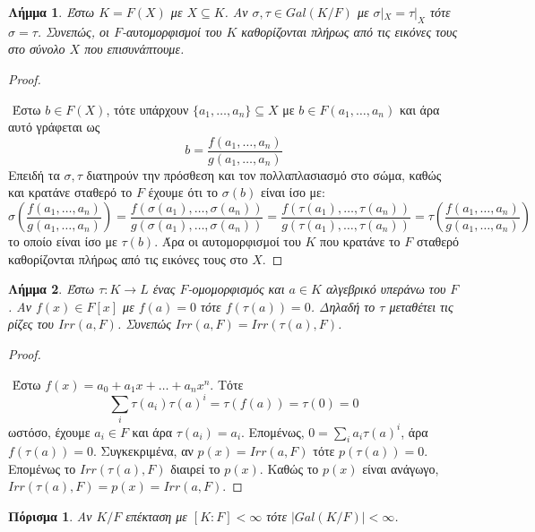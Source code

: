 \documentclass[oneside,a4paper]{article}
\newtheorem{lemma}{Λήμμα}
\newtheorem{cor}{Πόρισμα}
\begin{document}
\begin{lemma}
	Έστω $K=F(X)$ με $X \subseteq K$. Αν $\sigma , \tau \in Gal(K/F)$ με $\sigma|_X = \tau|_X $ τότε $\sigma = \tau$. Συνεπώς, οι $F$-αυτομορφισμοί του $K$ καθορίζονται πλήρως από τις εικόνες τους στο σύνολο $X$ που επισυνάπτουμε.
\end{lemma}

\begin{proof} $ $
	
	$ $\newline
	Έστω $b \in F(X)$, τότε υπάρχουν $\{a_1, \ldots, a_n\} \subseteq X$ με $b \in F(a_1 , \ldots , a_n)$ και άρα αυτό γράφεται ως
	$$ b= \frac{f(a_1,\ldots, a_n)}{g(a_1, \ldots , a_n)}$$
	Επειδή τα $\sigma , \tau$ διατηρούν την πρόσθεση και τον πολλαπλασιασμό στο σώμα, καθώς και κρατάνε σταθερό το $F$ έχουμε ότι το $\sigma (b)$ είναι ίσο με:
	$$\sigma \left( \frac{f(a_1,\ldots, a_n)}{g(a_1, \ldots , a_n)} \right) =\frac{f(\sigma(a_1),\ldots, \sigma(a_n))}{g(\sigma(a_1), \ldots , \sigma (a_n))} = \frac{f(\tau(a_1),\ldots, \tau(a_n))}{g(\tau(a_1), \ldots , \tau(a_n))} = \tau \left( \frac{f(a_1,\ldots, a_n)}{g(a_1, \ldots , a_n)} \right)$$
	το οποίο είναι ίσο με $\tau (b)$. Άρα οι αυτομορφισμοί του $K$ που κρατάνε το $F$ σταθερό καθορίζονται πλήρως από τις εικόνες τους στο $X$.
\end{proof}



\begin{lemma}
	Έστω $\tau : K \rightarrow L$ ένας $F$-ομομορφισμός και $a \in K$ αλγεβρικό υπεράνω του $F$. Αν $f(x) \in F[x]$ με $f(a)=0$ τότε $f(\tau(a)) = 0$. Δηλαδή το $\tau$ μεταθέτει τις ρίζες του $Irr(a,F)$. Συνεπώς $Irr(a,F) = Irr(\tau(a),F)$.
\end{lemma}

\begin{proof} $ $

	$ $\newline
	Έστω $f(x) = a_0 + a_1 x + \ldots + a_n x^n$. Τότε 
	$$\sum\limits_{i} \tau( a_i) \tau(a)^i = \tau ( f(a)) = \tau ( 0) = 0$$
	ωστόσο, έχουμε $a_i \in F$ και άρα $\tau (a_i) = a_i$. Επομένως, $0 = \sum\limits_i a_i \tau(a)^i$, άρα $f(\tau(a))= 0$. Συγκεκριμένα, αν $p(x) = Irr(a,F)$ τότε $p(\tau(a)) = 0$. Επομένως το $Irr(\tau(a),F)$ διαιρεί το $p(x)$. Καθώς το $p(x)$ είναι ανάγωγο, $Irr(\tau(a),F) = p(x) = Irr(a,F)$.

\end{proof}

\begin{cor}
	Αν $K/F$ επέκταση με $[K:F]<\infty$ τότε $|Gal(K/F)| <\infty$.
\end{cor}
\end{document}
